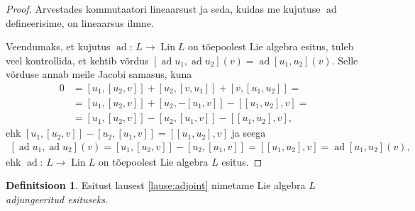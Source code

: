 \documentclass[12pt,a4paper,oneside]{article}
\theoremstyle{plain}
\theoremstyle{definition}
\newtheorem{definitsioon}{Definitsioon}[section]
\numberwithin{equation}{section}
\DeclareMathOperator{\ad}{ad}
\DeclareMathOperator{\Lin}{Lin}
\begin{document}
\begin{proof}
Arvestades kommutaatori lineaarsust ja seda, kuidas me kujutuse 
$\ad$ defineerisime, on lineaarsus ilmne.

Veendumaks, et kujutus $\ad \colon\, L \rightarrow \Lin L$ on tõepoolest 
Lie algebra esitus, tuleb veel kontrollida, et kehtib võrdus 
$\left[\ad u_1, \ad u_2 \right] \left(v\right) = 
\ad \left[u_1, u_2 \right] \left(v\right)$. Selle võrduse 
annab meile Jacobi samasus, kuna
\begin{align*}
0 &= \left[ u_1, \left[u_2, v\right] \right] + \left[ u_2, 
	\left[v, u_1 \right] \right] + 
	\left[ v, \left[u_1, u_2\right] \right] = \\
&= \left[ u_1, \left[u_2, v\right] \right] + 
	\left[ u_2, -\left[u_1, v \right] \right] - 
	\left[\left[u_1, u_2\right], v\right] = \\
&= \left[ u_1, \left[u_2, v\right] \right] - 
	\left[ u_2, \left[u_1, v \right] \right] - 
	\left[\left[u_1, u_2\right], v\right],
\end{align*}
ehk $\left[ u_1, \left[u_2, v\right] \right] - 
	\left[ u_2, \left[u_1, v \right] \right] = 
	\left[\left[u_1, u_2\right], v\right]$ ja seega
\begin{align*}
\left[\ad u_1, \ad u_2 \right] \left(v\right) = 
	\left[u_1, \left[u_2, v\right]\right ] - 
	\left[u_2, \left[u_1, v\right]\right] = 
	\left[\left[u_1, u_2\right], v\right] = 
	\ad \left[u_1, u_2 \right] \left(v\right),
\end{align*}
ehk $\ad \colon\, L \rightarrow \Lin L$ on tõepoolest Lie algebra $L$ 
esitus.
\end{proof}

\begin{definitsioon}
Esitust lausest \ref{lause:adjoint} nimetame Lie algebra $L$ 
\emph{\mbox{adjungeeritud} esituseks}.
\end{definitsioon}
\end{document}
